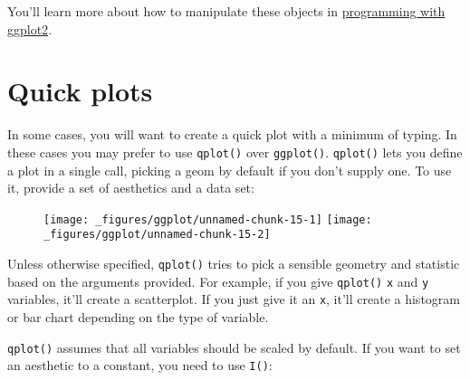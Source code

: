 You'll learn more about how to manipulate these objects in
\protect\hyperlink{cha:programming}{programming with ggplot2}.

\hypertarget{qplot}{\section{Quick plots}\label{qplot}}

In some cases, you will want to create a quick plot with a minimum of
typing. In these cases you may prefer to use \texttt{qplot()} over
\texttt{ggplot()}. \texttt{qplot()} lets you define a plot in a single
call, picking a geom by default if you don't supply one. To use it,
provide a set of aesthetics and a data set: 

\begin{Shaded}
\begin{Highlighting}[]
 
 
\end{Highlighting}
\end{Shaded}

\begin{figure}[H]
  \texttt{[image: \_figures/ggplot/unnamed-chunk-15-1]}%
  \texttt{[image: \_figures/ggplot/unnamed-chunk-15-2]}
\end{figure}

Unless otherwise specified, \texttt{qplot()} tries to pick a sensible
geometry and statistic based on the arguments provided. For example, if
you give \texttt{qplot()} \texttt{x} and \texttt{y} variables, it'll
create a scatterplot. If you just give it an \texttt{x}, it'll create a
histogram or bar chart depending on the type of variable.

\texttt{qplot()} assumes that all variables should be scaled by default.
If you want to set an aesthetic to a constant, you need to use
\texttt{I()}: 

\begin{Shaded}
\begin{Highlighting}[]
  \NormalTok{)}
  \NormalTok{(}\NormalTok{))}
\end{Highlighting}
\end{Shaded}

